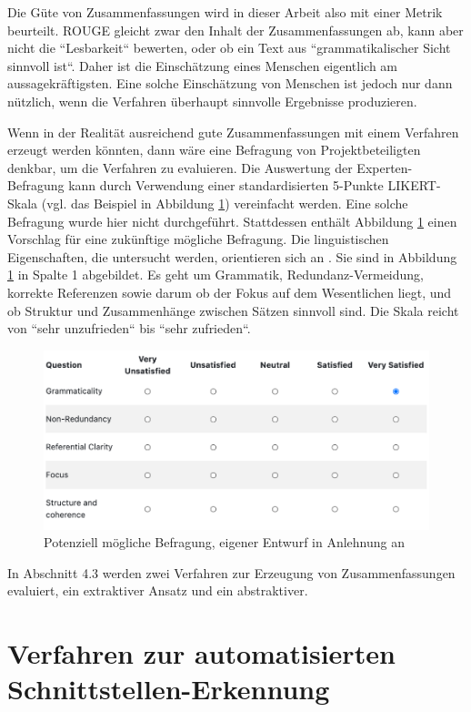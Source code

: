 Die Güte von Zusammenfassungen wird in dieser Arbeit also mit einer Metrik beurteilt. ROUGE gleicht zwar den Inhalt der Zusammenfassungen ab, kann aber nicht die ``Lesbarkeit`` bewerten, oder ob ein Text aus ``grammatikalischer Sicht sinnvoll ist``. Daher ist die Einschätzung eines Menschen eigentlich am aussagekräftigsten. Eine solche Einschätzung von Menschen ist jedoch nur dann nützlich, wenn die Verfahren überhaupt sinnvolle Ergebnisse produzieren. 

Wenn in der Realität ausreichend gute Zusammenfassungen mit einem Verfahren erzeugt werden könnten, dann wäre eine Befragung von Projektbeteiligten denkbar, um die Verfahren zu evaluieren. Die Auswertung der Experten-Befragung kann durch Verwendung einer standardisierten 5-Punkte LIKERT-Skala (vgl. das Beispiel in Abbildung \ref{Abbildung:Dang}) vereinfacht werden. Eine solche Befragung wurde hier nicht durchgeführt. Stattdessen enthält Abbildung \ref{Abbildung:Dang} einen Vorschlag für eine zukünftige mögliche Befragung. Die linguistischen Eigenschaften, die untersucht werden, orientieren sich an \cite{Dang}. Sie sind in Abbildung \ref{Abbildung:Dang} in Spalte 1 abgebildet. Es geht um Grammatik, Redundanz-Vermeidung, korrekte Referenzen sowie darum ob der Fokus auf dem Wesentlichen liegt, und ob Struktur und Zusammenhänge zwischen Sätzen sinnvoll sind. Die Skala reicht von ``sehr unzufrieden`` bis ``sehr zufrieden``. 
 
\begin{figure}[h]
\centering
\includegraphics[scale=0.9]{content/pics/Picture_9.png}
\caption{ Potenziell mögliche Befragung, eigener Entwurf in Anlehnung an \cite{Dang}}
\label{Abbildung:Dang}
\end{figure}

In Abschnitt 4.3 werden zwei Verfahren zur Erzeugung von Zusammenfassungen evaluiert, ein extraktiver Ansatz und ein abstraktiver.


\section{Verfahren zur automatisierten Schnittstellen-Erkennung}

